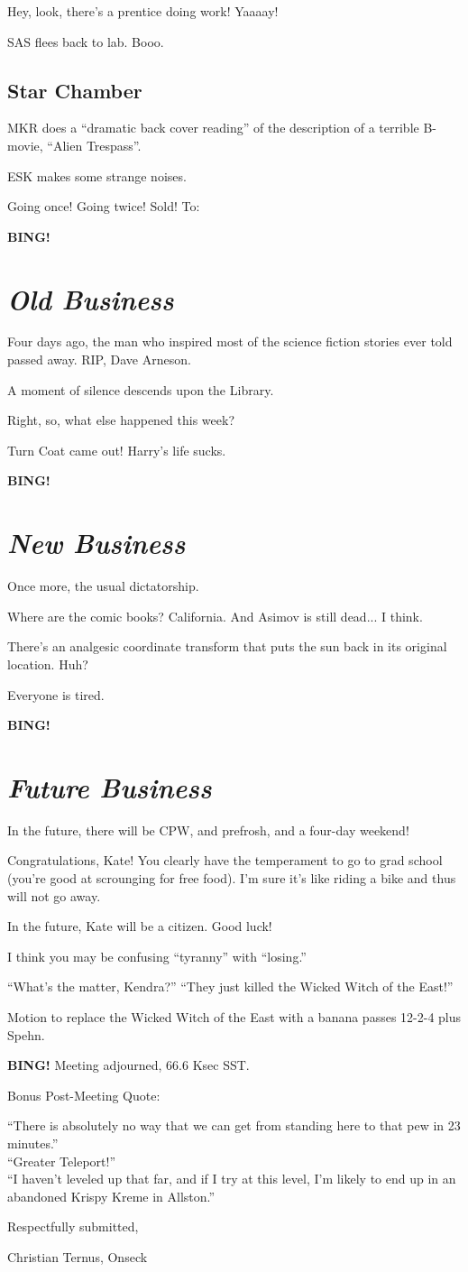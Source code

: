 \documentclass[10pt]{article}
\newcommand{\bing}{{\bf BING!} }
\newcommand{\goto}[1]{\bing \vskip 12pt \section*{{\em{#1}}}}
\newcommand{\ps}{ plus Spehn\xspace}
\begin{document}
Hey, look, there's a prentice doing work!  Yaaaay!

SAS flees back to lab.  Booo.

\subsection*{Star Chamber}

MKR does a ``dramatic back cover reading'' of the description of a
terrible B-movie, ``Alien Trespass''.

ESK makes some strange noises.

Going once!  Going twice!  Sold! To:

\goto{Old Business}

Four days ago, the man who inspired most of the science fiction
stories ever told passed away.  RIP, Dave Arneson.

A moment of silence descends upon the Library.

Right, so, what else happened this week?

Turn Coat came out!  Harry's life sucks.

\goto{New Business}

Once more, the usual dictatorship.

Where are the comic books?  California.  And Asimov is still dead... I think.

There's an analgesic coordinate transform that puts the sun back in
its original location.  Huh?

Everyone is tired.

\goto{Future Business}

In the future, there will be CPW, and prefrosh, and a four-day
weekend!

Congratulations, Kate!  You clearly have the temperament to go to grad
school (you're good at scrounging for free food).  I'm sure it's like
riding a bike and thus will not go away.

In the future, Kate will be a citizen.  Good luck!

I think you may be confusing ``tyranny'' with ``losing.''

``What's the matter, Kendra?'' ``They just killed the Wicked Witch of the East!''

Motion to replace the Wicked Witch of the East with a banana passes 12-2-4\ps.

\bing
\noindent
Meeting adjourned, 66.6 Ksec SST.

Bonus Post-Meeting Quote:

``There is absolutely no way that we can get from standing here to that pew in 23 minutes.''\\
``Greater Teleport!''\\
``I haven't leveled up that far, and if I try at this level, I'm
likely to end up in an abandoned Krispy Kreme in Allston.''\\

\vspace{18pt}

\centerline{Respectfully submitted,}
\centerline{Christian Ternus, Onseck}
\end{document}
